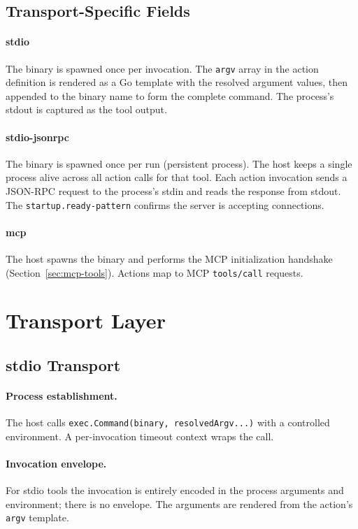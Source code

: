 \subsection{Transport-Specific Fields}

\paragraph{stdio} The binary is spawned once per invocation.  The
\texttt{argv} array in the action definition is rendered as a Go template with
the resolved argument values, then appended to the binary name to form the
complete command.  The process's stdout is captured as the tool output.

\paragraph{stdio-jsonrpc} The binary is spawned once per run (persistent
process).  The host keeps a single process alive across all action calls for
that tool.  Each action invocation sends a JSON-RPC request to the process's
stdin and reads the response from stdout.  The \texttt{startup.ready-pattern}
confirms the server is accepting connections.

\paragraph{mcp} The host spawns the binary and performs the MCP initialization
handshake (Section~\ref{sec:mcp-tools}).  Actions map to MCP \texttt{tools/call}
requests.

\section{Transport Layer}
\label{sec:tool-transport}

\subsection{stdio Transport}

\paragraph{Process establishment.}
The host calls \texttt{exec.Command(binary, resolvedArgv...)} with a
controlled environment.  A per-invocation timeout context wraps the call.

\paragraph{Invocation envelope.}
For stdio tools the invocation is entirely encoded in the process arguments
and environment; there is no envelope.  The arguments are rendered from the
action's \texttt{argv} template.


